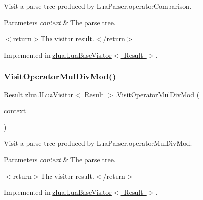 Visit a parse tree produced by Lua\+Parser.\+operator\+Comparison. 


\begin{DoxyParams}{Parameters}
{\em context} & The parse tree.\\
\hline
\end{DoxyParams}
$<$return$>$The visitor result.$<$/return$>$ 

Implemented in \mbox{\hyperlink{classzlua_1_1_lua_base_visitor_a5339d6c6be6a7f222663c1cb2035925e}{zlua.\+Lua\+Base\+Visitor$<$ Result $>$}}.

\mbox{\label{interfacezlua_1_1_i_lua_visitor_a3d3f85dff116b4052af62e3d712fb958}} 
\subsubsection{\texorpdfstring{Visit\+Operator\+Mul\+Div\+Mod()}{VisitOperatorMulDivMod()}}
{\footnotesize\ttfamily Result \mbox{\hyperlink{interfacezlua_1_1_i_lua_visitor}{zlua.\+I\+Lua\+Visitor}}$<$ Result $>$.Visit\+Operator\+Mul\+Div\+Mod (\begin{DoxyParamCaption}\item[{\mbox{[}\+Not\+Null\mbox{]} \mbox{\hyperlink{classzlua_1_1_lua_parser_1_1_operator_mul_div_mod_context}{Lua\+Parser.\+Operator\+Mul\+Div\+Mod\+Context}}}]{context }\end{DoxyParamCaption})}



Visit a parse tree produced by Lua\+Parser.\+operator\+Mul\+Div\+Mod. 


\begin{DoxyParams}{Parameters}
{\em context} & The parse tree.\\
\hline
\end{DoxyParams}
$<$return$>$The visitor result.$<$/return$>$ 

Implemented in \mbox{\hyperlink{classzlua_1_1_lua_base_visitor_ac08ae206c958ce20c6774f14b31615f8}{zlua.\+Lua\+Base\+Visitor$<$ Result $>$}}.

\mbox{\label{interfacezlua_1_1_i_lua_visitor_a35b6ad774142fb2dca6616d513025703}} 
